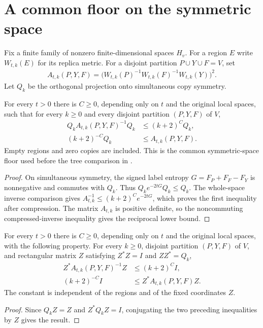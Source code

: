 \section{A common floor on the symmetric space}

Fix a finite family of nonzero finite-dimensional spaces $H_v$.
For a region $E$ write $W_{t,k}(E)$ for its replica metric.
For a disjoint partition $P\cup Y\cup F=V$, set
\begin{align}
  A_{t,k}(P,Y,F)
    =\bigl(W_{t,k}(P)^{-1}W_{t,k}(F)^{-1}W_{t,k}(Y)\bigr)^2.
\end{align}
Let $Q_k$ be the orthogonal projection onto simultaneous copy symmetry.

\begin{theorem}
  \label{thm:symmetric_replica_inverse_bound_floor}
  \leanok
  For every $t>0$ there is $C\geq0$, depending only on $t$ and the
  original local spaces, such that for every $k\geq0$ and every disjoint
  partition $(P,Y,F)$ of $V$,
  \begin{align}
    Q_k A_{t,k}(P,Y,F)^{-1} Q_k&\leq(k+2)^C Q_k,\\
    (k+2)^{-C}Q_k&\leq A_{t,k}(P,Y,F).
  \end{align}
  Empty regions and zero copies are included. This is the common
  symmetric-space floor used before the tree comparison in
  \cite[Section~8]{OpenAI2026AreaLaw}.
\end{theorem}
\begin{proof}\leanok
  On simultaneous symmetry, the signed label entropy
  $G=F_P+F_F-F_Y$ is nonnegative and commutes with $Q_k$.
  Thus $Q_ke^{-2tG}Q_k\leq Q_k$. The whole-space inverse comparison
  gives $A_{t,k}^{-1}\leq(k+2)^Ce^{-2tG}$, which proves the first
  inequality after compression. The matrix $A_{t,k}$ is positive
  definite, so the noncommuting compressed-inverse inequality gives
  the reciprocal lower bound.
\end{proof}

\begin{theorem}
  \label{thm:symmetric_replica_isometric_floor}
  \leanok
  For every $t>0$ there is $C\geq0$, depending only on $t$ and the
  original local spaces, with the following property. For every
  $k\geq0$, disjoint partition $(P,Y,F)$ of $V$, and rectangular
  matrix $Z$ satisfying $Z^*Z=I$ and $ZZ^*=Q_k$,
  \begin{align}
    Z^*A_{t,k}(P,Y,F)^{-1}Z&\leq(k+2)^C I,\\
    (k+2)^{-C}I&\leq Z^*A_{t,k}(P,Y,F)Z.
  \end{align}
  The constant is independent of the regions and of the fixed
  coordinates $Z$.
\end{theorem}
\begin{proof}\leanok
  Since $Q_kZ=Z$ and $Z^*Q_kZ=I$, conjugating the two preceding
  inequalities by $Z$ gives the result.
\end{proof}

